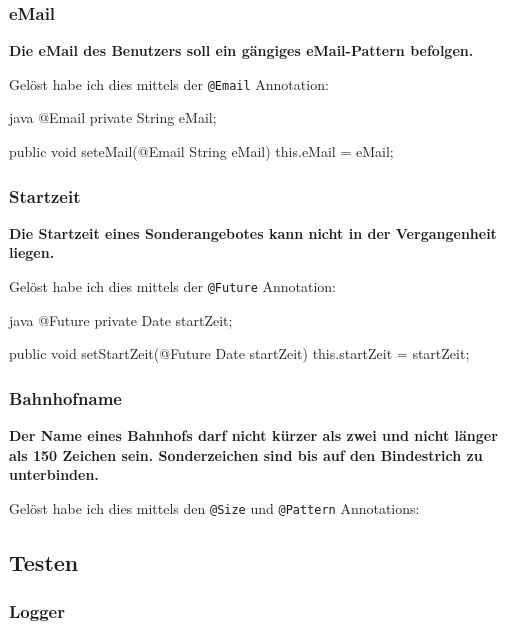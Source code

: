 \subsubsection{eMail}
\textbf{Die eMail des Benutzers soll ein gängiges eMail-Pattern befolgen.}

Gelöst habe ich dies mittels der \texttt{@Email} Annotation:

\begin{code}{java}
@Email
private String eMail;

public void seteMail(@Email String eMail) {
    this.eMail = eMail;
}
\end{code}

\subsubsection{Startzeit}
\textbf{Die Startzeit eines Sonderangebotes kann nicht in der Vergangenheit liegen.}

Gelöst habe ich dies mittels der \texttt{@Future} Annotation:

\begin{code}{java}
@Future
private Date startZeit;

public void setStartZeit(@Future Date startZeit) {
    this.startZeit = startZeit;
}
\end{code}

\subsubsection{Bahnhofname}
\textbf{Der Name eines Bahnhofs darf nicht kürzer als zwei und nicht länger als 150 Zeichen sein. Sonderzeichen sind bis auf den Bindestrich zu unterbinden.}

Gelöst habe ich dies mittels den \texttt{@Size} und \texttt{@Pattern} Annotations:

\clearpage
\subsection{Testen}

\subsubsection{Logger}

